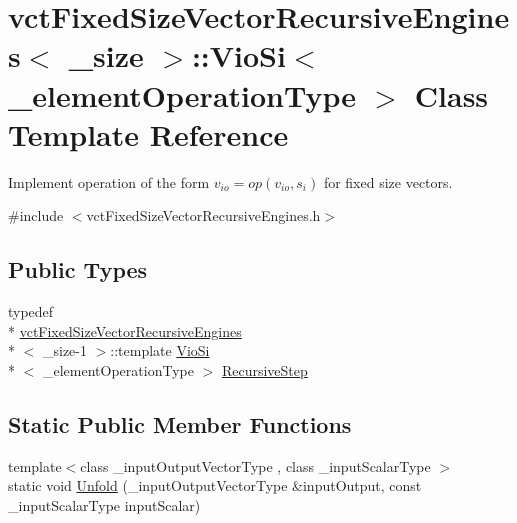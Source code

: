 \hypertarget{classvct_fixed_size_vector_recursive_engines_1_1_vio_si}{\section{vct\-Fixed\-Size\-Vector\-Recursive\-Engines$<$ \-\_\-size $>$\-:\-:Vio\-Si$<$ \-\_\-element\-Operation\-Type $>$ Class Template Reference}
\label{classvct_fixed_size_vector_recursive_engines_1_1_vio_si}
}


Implement operation of the form $ v_{io} = op(v_{io}, s_i)$ for fixed size vectors.  




{\ttfamily \#include $<$vct\-Fixed\-Size\-Vector\-Recursive\-Engines.\-h$>$}

\subsection*{Public Types}
\begin{DoxyCompactItemize}
\item 
typedef \\*
\hyperlink{classvct_fixed_size_vector_recursive_engines}{vct\-Fixed\-Size\-Vector\-Recursive\-Engines}\\*
$<$ \-\_\-size-\/1 $>$\-::template \hyperlink{classvct_fixed_size_vector_recursive_engines_1_1_vio_si}{Vio\-Si}\\*
$<$ \-\_\-element\-Operation\-Type $>$ \hyperlink{classvct_fixed_size_vector_recursive_engines_1_1_vio_si_aa8b9d5743826725a5da54114f23fea1e}{Recursive\-Step}
\end{DoxyCompactItemize}
\subsection*{Static Public Member Functions}
\begin{DoxyCompactItemize}
\item 
{\footnotesize template$<$class \-\_\-input\-Output\-Vector\-Type , class \-\_\-input\-Scalar\-Type $>$ }\\static void \hyperlink{classvct_fixed_size_vector_recursive_engines_1_1_vio_si_a0c43157b7a2f159f481b0c3f33ecac9d}{Unfold} (\-\_\-input\-Output\-Vector\-Type \&input\-Output, const \-\_\-input\-Scalar\-Type input\-Scalar)
\end{DoxyCompactItemize}


